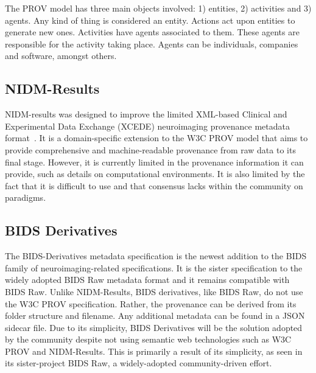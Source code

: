 \documentclass{report}
\newcommand{\tristan}[1]{\textcolor{red}{TG: #1}}
\begin{document}
            The PROV model has three main objects involved: 1) entities, 2) 
            activities and 3) agents. Any kind of thing is considered an entity.
            Actions act upon entities to generate new ones. Activities have 
            agents associated to them. These agents are responsible for the 
            activity taking place. Agents can be individuals, companies and 
            software, amongst others.
            
            \subsection{NIDM-Results}
                NIDM-results was designed to improve the limited XML-based 
                Clinical and Experimental Data Exchange (XCEDE) neuroimaging
                provenance metadata format~\cite{Maumet:2016aa}. It is a domain-specific extension
                to the W3C PROV model that aims to provide comprehensive and
                machine-readable provenance from raw data to its final stage. %
                However, it is currently limited in the provenance 
                information it can provide, such as details on computational 
                environments. It is also limited by the fact that it is difficult to use and that consensus lacks
                within the community on paradigms. %

            \subsection{BIDS Derivatives}
                The BIDS-Derivatives metadata specification is the newest 
                addition to the BIDS family of neuroimaging-related 
                specifications. It is the sister
                specification to the widely adopted BIDS Raw metadata format 
                and it remains compatible with BIDS Raw. 
                Unlike NIDM-Results, BIDS derivatives, like BIDS Raw, do not
                use the W3C PROV specification. Rather, the provenance can be
                derived from its folder structure and filename. Any additional
                metadata can be found in a JSON sidecar file. Due to its simplicity,
                BIDS Derivatives will be the solution adopted by the community 
                despite not using semantic web technologies such as W3C PROV and NIDM-Results.
                This is primarily a result of its simplicity, as seen in its 
                sister-project BIDS Raw, a widely-adopted community-driven effort.
            
\end{document}
